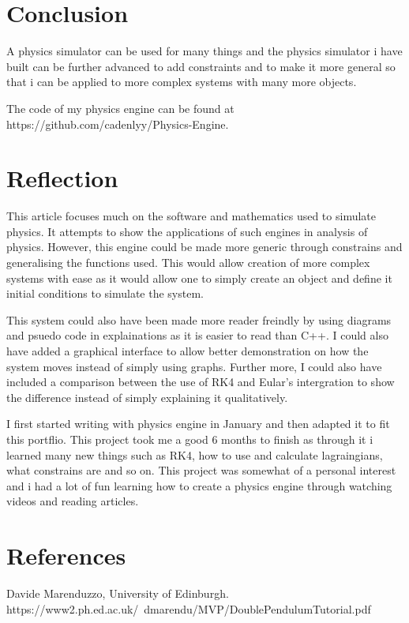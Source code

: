 \documentclass[12pt, a2paper]{article}
\begin{document}
\section{Conclusion}
A physics simulator can be used for many things and the physics simulator i have built can be further advanced to add constraints and to make it more general so that i can be applied to more complex systems with many more objects.

The code of my physics engine can be found at https://github.com/cadenlyy/Physics-Engine.

\section{Reflection}
This article focuses much on the software and mathematics used to simulate physics. It attempts to show the applications of such engines in analysis of physics. However, this engine could be made more generic through constrains and generalising the functions used. This would allow creation of more complex systems with ease as it would allow one to simply create an object and define it initial conditions to simulate the system. 

This system could also have been made more reader freindly by using diagrams and psuedo code in explainations as it is easier to read than C++. I could also have added a graphical interface to allow better demonstration on how the system moves instead of simply using graphs. Further more, I could also have included a comparison between the use of RK4 and Eular's intergration to show the difference instead of simply explaining it qualitatively. 

I first started writing with physics engine in January and then adapted it to fit this portflio. This project took me a good 6 months to finish as through it i learned many new things such as RK4, how to use and calculate lagraingians, what constrains are and so on. This project was somewhat of a personal interest and i had a lot of fun learning how to create a physics engine through watching videos and reading articles.

\section{References}
Davide Marenduzzo, University of Edinburgh. 
https://www2.ph.ed.ac.uk/~dmarendu/MVP/DoublePendulumTutorial.pdf
\end{document}
